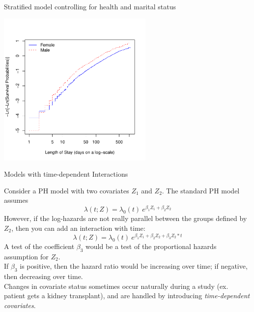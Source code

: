 \documentclass[envcountsect, 10pt, portrait, palatino]{beamer}
\begin{document}
\begin{frame}{Stratified model controlling for health and marital status}
\centerline{\includegraphics[width=3in]{ch12stratph.pdf}}
\end{frame}
\begin{frame}{Models with time-dependent Interactions}

Consider a PH model with two covariates $Z_1$ and $Z_2$.
The standard PH model assumes
\[   \lambda(t; Z)  = \lambda_0(t) ~ e^{\beta_1 Z_1 + \beta_2 Z_2} \]
However, if the log-hazards are not really parallel
between the groups defined by $Z_2$, then
you can add an interaction with time:
\[   \lambda(t; Z)  = \lambda_0(t) ~ e^{\beta_1 Z_1 + \beta_2 Z_2
    + \beta_3 Z_2*t} \]
A test of the coefficient $\beta_3$ would be a test of the
proportional hazards assumption for $Z_2$.
\\[2ex]
If $\beta_3$ is positive, then the hazard ratio would be increasing
over time; if negative, then decreasing over time.
\\[2ex]
Changes in covariate status sometimes occur naturally during
a study (ex. patient gets a kidney transplant), and are handled by
introducing {\em time-dependent covariates}.
\end{frame}
\end{document}
